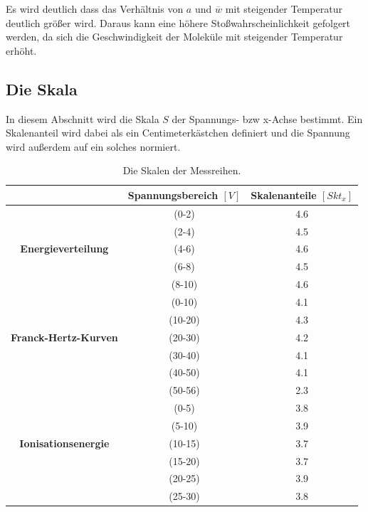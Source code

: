   
Es wird deutlich dass das Verhältnis von $a$ und $\overline{w}$ mit steigender Temperatur deutlich größer wird.
Daraus kann eine höhere Sto\ss{}wahrscheinlichkeit gefolgert werden, da sich die Geschwindigkeit der Moleküle mit steigender Temperatur erhöht.

\subsection{Die Skala}
In diesem Abschnitt wird die Skala $S$ der Spannungs- bzw x-Achse bestimmt.
Ein Skalenanteil wird dabei als ein Centimeterkästchen definiert und die Spannung wird außerdem auf ein solches normiert.
\begin{table}[H]
  \begin{center}
    \label{tab:skala}
    \begin{tabular}{c|c|c}
       & \textbf{Spannungsbereich $[V]$} & \textbf{Skalenanteile $[Skt_x]$}\\
      \hline
                                  & (0-2) & 4.6 \\
                                  & (2-4) & 4.5 \\
      \textbf{Energieverteilung}  & (4-6) & 4.6 \\
                                  & (6-8) & 4.5 \\
                                  & (8-10) & 4.6\\
      \hline
                                    & (0-10) & 4.1 \\
                                    & (10-20) & 4.3 \\
      \textbf{Franck-Hertz-Kurven}  & (20-30) & 4.2 \\
                                    & (30-40) & 4.1 \\
                                    & (40-50) & 4.1 \\
                                    & (50-56) & 2.3 \\
      \hline
                                  & (0-5) & 3.8 \\
                                  & (5-10) & 3.9 \\
      \textbf{Ionisationsenergie} & (10-15) & 3.7 \\
                                  & (15-20) & 3.7 \\
                                  & (20-25) & 3.9 \\
                                  & (25-30) & 3.8
    \end{tabular}
    \caption{Die Skalen der Messreihen.}
  \end{center}
\end{table}


